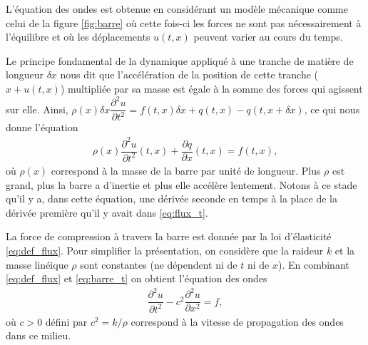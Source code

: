 \documentclass[12pt,a4paper,twoside]{article}
\begin{document}
L'\'equation des ondes est obtenue en consid\'erant un mod\`ele m\'ecanique
comme celui de la figure \ref{fig:barre} o\`u cette fois-ci les forces ne
sont pas n\'ecessairement \`a l'\'equilibre et o\`u les d\'eplacements
$u(t,x)$ peuvent varier au cours du temps.

Le principe fondamental de la dynamique appliqu\'e \`a une tranche de mati\`ere
de longueur $\delta x$ nous dit que l'acc\'el\'eration de la position de cette tranche
($x+u(t,x)$) multipli\'ee par sa masse est \'egale \`a la somme des forces qui
agissent sur elle.
Ainsi, $\rho(x) \delta x \dfrac{\partial^2 u}{\partial t^2} = 
f(t,x) \delta x + q(t,x) - q(t, x + \delta x)$, ce qui nous donne l'\'equation
\begin{align}
  \label{eq:barre_t}
  \rho(x) \dfrac{\partial^2 u}{\partial t^2}(t,x) + \dfrac{\partial q}{\partial x}(t,x) = f(t,x) ,
\end{align}
o\`u $\rho(x)$ correspond \`a la masse de la barre par unit\'e de longueur.
Plus $\rho$ est grand, plus la barre a d'inertie et plus elle acc\'el\`ere lentement.
Notons \`a ce stade qu'il y a, dans cette \'equation, une d\'eriv\'ee seconde en temps
\`a la place de la d\'eriv\'ee premi\`ere qu'il y avait dans \eqref{eq:flux_t}.

La force de compression \`a travers la barre est donn\'ee par la loi d'\'elasticit\'e
\eqref{eq:def_flux}.
Pour simplifier la pr\'esentation, on consid\`ere que la raideur $k$ et la masse
lin\'eique $\rho$ sont constantes (ne d\'ependent ni de $t$ ni de $x$).
En combinant \eqref{eq:def_flux} et \eqref{eq:barre_t} on obtient l'\'equation des ondes
\begin{align}
  \label{eq:ondes}
  \dfrac{\partial^2 u}{\partial t^2} - c^2 \dfrac{\partial^2 u}{\partial x^2} = f ,
\end{align}
o\`u $c>0$ d\'efini par $c^2 = k/\rho$ correspond \`a la vitesse de propagation
des ondes dans ce milieu.
\end{document}
